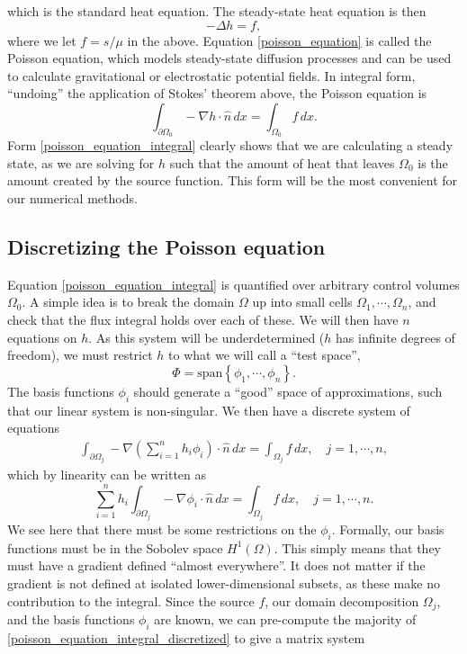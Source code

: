 \documentclass[11pt,a4paper]{memoir}
\newcommand{\om}{{\Omega}}
\newcommand{\pom}{{\partial\Omega}}
\newcommand{\omn}{{\Omega_0}}
\newcommand{\pomn}{{\partial\Omega_0}}
\begin{document}
which is the standard heat equation.
The steady-state heat equation is then
\begin{equation}\label{poisson_equation}
    -\Delta h = f,
\end{equation}
where we let $f = s/\mu$ in the above. Equation \eqref{poisson_equation} is called the Poisson equation,
which models steady-state diffusion processes and can be used to calculate gravitational or electrostatic potential fields.
In integral form, ``undoing'' the application of Stokes' theorem above, the Poisson equation is
\begin{equation}\label{poisson_equation_integral}
    \int_{\pomn} -\nabla h\cdot \hat{n}\,dx = \int_{\omn} f\,dx.
\end{equation}
Form \eqref{poisson_equation_integral} clearly shows that we are calculating a steady state,
as we are solving for $h$ such that the amount of heat that leaves $\Omega_0$ is the amount created by the source function.
This form will be the most convenient for our numerical methods.

\subsection{Discretizing the Poisson equation}\label{discretizing_poisson}
Equation \eqref{poisson_equation_integral} is quantified over arbitrary control volumes $\Omega_0$.
A simple idea is to break the domain $\Omega$ up into small cells $\Omega_1,\cdots,\Omega_n$, and check that the flux integral holds over each of these.
We will then have $n$ equations on $h$. As this system will be underdetermined ($h$ has infinite degrees of freedom), we must
restrict $h$ to what we will call a ``test space'',
    $$\Phi = \text{span}\left\{\phi_1,\cdots,\phi_n\right\}.$$
The basis functions $\phi_i$ should generate a ``good'' space of approximations,
such that our linear system is non-singular.
We then have a discrete system of equations
\begin{align*}
    \int_{\pom_j} -\nabla \left(\sum_{i=1}^n h_i\phi_i\right)\cdot \hat{n}\,dx = \int_{\om_j} f\,dx,\quad j=1,\cdots,n,
\end{align*}
which by linearity can be written as
\begin{equation}\label{poisson_equation_integral_discretized}
    \sum_{i=1}^n h_i\int_{\pom_j} -\nabla \phi_i \cdot \hat{n}\,dx = \int_{\om_j} f\,dx,\quad j=1,\cdots,n.
\end{equation}
We see here that there must be some restrictions on the $\phi_i$.
Formally, our basis functions must be in the Sobolev space $H^1(\Omega)$. This simply means that they must have a gradient defined ``almost everywhere''.
It does not matter if the gradient is not defined at isolated lower-dimensional subsets, as these make no contribution to
the integral. Since the source $f$, our domain decomposition $\Omega_j$, and the basis functions $\phi_i$ are known, we can pre-compute
the majority of \eqref{poisson_equation_integral_discretized} to give a matrix system
\end{document}
